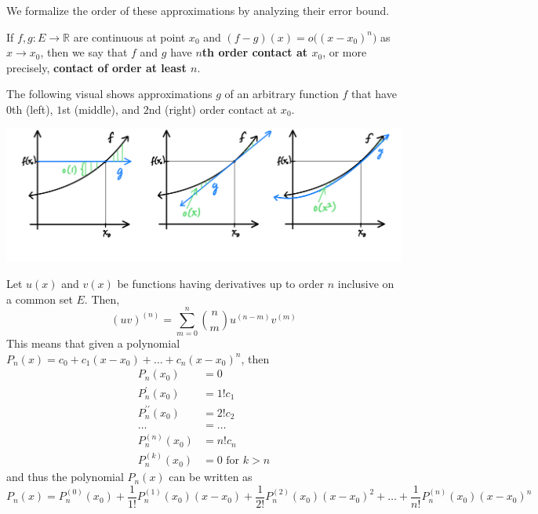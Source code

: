   We formalize the order of these approximations by analyzing their error bound. 

  \begin{definition}
    If $f, g: E \longrightarrow \mathbb{R}$ are continuous at point $x_0$ and $(f - g) (x) = o\big( (x - x_0)^n \big)$ as $x \rightarrow x_0$, then we say that $f$ and $g$ have \textbf{$n$th order contact at $x_0$}, or more precisely, \textbf{contact of order at least $n$}. 

    The following visual shows approximations $g$ of an arbitrary function $f$ that have $0$th (left), $1$st (middle), and $2$nd (right) order contact at $x_0$. 
    \begin{center}
        \includegraphics[scale=0.25]{img/nth_order_contact.PNG}
    \end{center}
  \end{definition}

  \begin{lemma}
    Let $u(x)$ and $v(x)$ be functions having derivatives up to order $n$ inclusive on a common set $E$. Then, 
    \[(uv)^{(n)} = \sum_{m = 0}^n \binom{n}{m} u^{(n-m)} v^{(m)}\]
    This means that given a polynomial $P_n (x) = c_0 + c_1 (x - x_0) + \ldots + c_n (x - x_0)^n$, then 
    \begin{align*}
        P_n(x_0) & = 0 \\
        P_n^\prime (x_0) & = 1! c_1 \\
        P_n^{\prime\prime} (x_0) & = 2! c_2 \\
        \ldots & = \ldots \\
        P_n^{(n)} (x_0) & = n! c_n \\
        P_n^{(k)} (x_0) & = 0 \text{ for } k > n
    \end{align*}
    and thus the polynomial $P_n (x)$ can be written as
    \[P_n (x) = P_n^{(0)} (x_0) + \frac{1}{1!} P_n^{(1)} (x_0) (x-x_0) + \frac{1}{2!} P_n^{(2)} (x_0) (x-x_0)^2 + \ldots + \frac{1}{n!} P_n^{(n)} (x_0) (x-x_0)^n\]
  \end{lemma}


